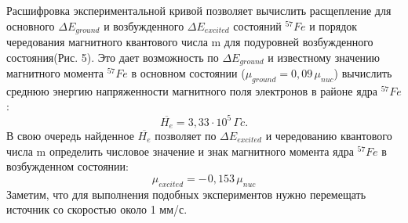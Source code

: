\documentclass{article}
\begin{document}
\indent Расшифровка экспериментальной кривой позволяет вычислить расщепление для основного $\Delta E_{ground}$ и возбужденного $\Delta E_{excited}$ состояний $^{57}Fe$ и порядок чередования магнитного квантового числа m для подуровней возбужденного состояния(Рис. 5). Это дает возможность по $\Delta E_{ground}$ и известному значению магнитного момента $^{57}Fe$ в основном состоянии ($\mu_{ground} = 0,09 \hspace{2pt} \mu_{nuc}$) вычислить среднюю энергию напряженности магнитного поля электронов в районе ядра $^{57}Fe$:
$$ \overline{H_e} = 3,33 \cdot 10^5 \hspace{2pt} \Gamma c .$$
\indent В свою очередь найденное $\overline{H_e}$ позволяет по $\Delta E_{excited}$ и чередованию квантового числа m определить числовое значение и знак магнитного момента ядра $^{57}Fe$ в возбужденном состоянии:
$$ \mu_{excited} = - \hspace{1pt} 0,153 \hspace{2pt} \mu_{nuc}$$
\indent Заметим, что для выполнения подобных экспериментов нужно перемещать источник со скоростью около 1 мм/с.
\end{document}
